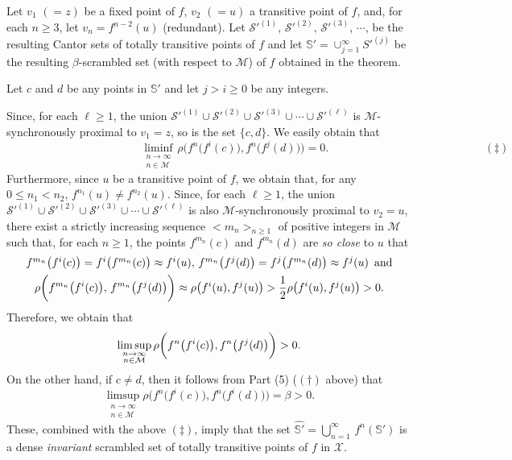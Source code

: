 \documentclass[12pt]{article}
\begin{document}
Let $v_1$ $(= z)$ be a fixed point of $f$, $v_2$ $(= u)$ a transitive point of $f$, and, for each $n \ge 3$, let $v_n = f^{n-2}(u)$ (redundant).  Let $\mathcal S'^{(1)}$, $\mathcal S'^{(2)}$, $\mathcal S'^{(3)}$, $\cdots$, be the resulting Cantor sets of totally transitive points of $f$ and let $\mathbb S' = \cup_{j = 1}^\infty S'^{(j)}$ be the resulting $\beta$-scrambled set (with respect to $\mathcal M$) of $f$ obtained in the theorem.

Let $c$ and $d$ be any points in $\mathbb S'$ and let $j > i \ge 0$ be any integers.   

Since, for each $\ell \ge 1$, the union $\mathcal S'^{(1)} \cup \mathcal S'^{(2)} \cup \mathcal S'^{(3)} \cup \cdots \cup \mathcal S'^{(\ell)}$ is $\mathcal M$-synchronously proximal to $v_1 = z$, so is the set $\{ c, d \}$.  We easily obtain that 
$$
\quad\qquad\qquad\qquad\qquad\qquad\,\,\,\,\, \liminf_{\substack{n \to \infty \\ n \in \mathcal M}} \rho\bigg(f^n\big(f^i(c)\big), f^n\big(f^j(d)\big)\bigg) = 0. \,\,\,\,\,\quad\qquad\qquad\qquad\qquad\qquad\qquad (\ddagger)
$$
\indent Furthermore, since $u$ be a transitive point of $f$, we obtain that, for any $0 \le n_1 < n_2$, $f^{n_1}(u) \ne f^{n_2}(u)$.  Since, for each $\ell \ge 1$, the union $\mathcal S'^{(1)} \cup \mathcal S'^{(2)} \cup \mathcal S'^{(3)} \cup \cdots \cup \mathcal S'^{(\ell)}
$ is also $\mathcal M$-synchronously proximal to $v_2 = u$, there exist a strictly increasing sequence $< m_n >_{n \ge 1}$ of positive integers in $\mathcal M$ such that, for each $n \ge 1$, the points $f^{m_n}(c)$ and $f^{m_n}(d)$ are {\it so close} to $u$ that 
\begin{multline*}
$$
f^{m_n}\big(f^i(c)\big) = f^i\big(f^{m_n}(c)\big) \approx f^i(u), \, f^{m_n}\big(f^j(d)\big) = f^j\big(f^{m_n}(d)\big) \approx f^j(u) \,\,\, \text{and} \\ 
\rho\bigg(f^{m_n}\big(f^i(c)\big), \, f^{m_n}\big(f^j(d)\big)\bigg) \approx \rho\big(f^i(u), f^j(u)\big) > \frac 12\rho\big(f^i(u), f^j(u)\big) > 0. 
$$
\end{multline*}
Therefore, we obtain that 
$$
\limsup_{\substack{n \to \infty \\ n \in \mathcal M}} \rho\bigg(f^n\big(f^i(c)\big), f^n\big(f^j(d)\big)\bigg) > 0.\vspace{,1in}
$$
\indent On the other hand, if $c \ne d$, then it follows from Part (5) ($(\dagger)$ above) that 
$$
\limsup_{\substack{n \to \infty \\ n \in \mathcal M}} \rho\bigg(f^n\big(f^i(c)\big), f^n\big(f^i(d)\big)\bigg) = \beta > 0.
$$
These, combined with the above $(\ddagger)$, imply that the set $\widehat {\mathbb S'} = \bigcup_{n=1}^\infty \, f^n(\mathbb S')$ is a dense {\it invariant} scrambled set of totally transitive points of $f$ in $\mathcal X$. 
\end{document}
